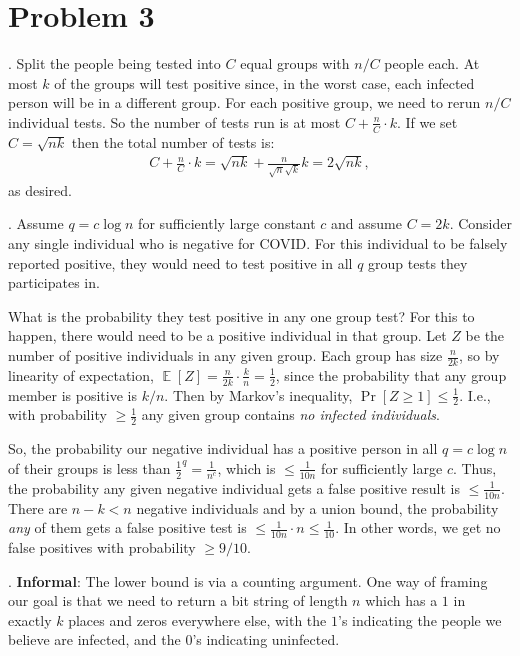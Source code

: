 \documentclass[11pt]{article}
\DeclareMathOperator*{\E}{\mathbb{E}}
\begin{document}
	
	\section*{Problem 3}
	\smallskip{}.\hspace{1em}
	Split the people being tested into $C$ equal groups with $n/C$ people each. At most $k$ of the groups will test positive since, in the worst case, each infected person will be in a different group. For each positive group, we need to rerun $n/C$ individual tests. So the number of tests run is at most $C + \frac{n}{C}\cdot k$. If we set $C = \sqrt{nk}$ then the total number of tests is:
	\begin{align*}
		C + \frac{n}{C}\cdot k = \sqrt{nk} + \frac{n}{\sqrt{n}\sqrt{k}}k = 2\sqrt{nk},
	\end{align*}  as desired. 

\smallskip{}.\hspace{1em}
Assume $q = c\log n$ for sufficiently large constant $c$ and assume $C = 2k$. Consider any single individual who is negative for COVID. For this individual to be falsely reported positive, they would need to test positive in all $q$ group tests they participates in. 

What is the probability they test positive in any one group test? For this to happen, there would need to be a positive individual in that group. Let $Z$ be the number of positive individuals in any given group. Each group has size $\frac{n}{2k}$, so by linearity of expectation, $\E[Z] = \frac{n}{2k}\cdot \frac{k}{n} = \frac{1}{2}$, since the probability that any group member is positive is $k/n$. Then by Markov's inequality, $\Pr[Z \geq 1] \leq \frac{1}{2}$. I.e., with probability $\geq \frac{1}{2}$ any given group contains \emph{no infected individuals}. 

So, the probability our negative individual has a positive person in all $q = c\log n$ of their groups is less than $\frac{1}{2}^{q} = \frac{1}{n^c}$, which is $\leq \frac{1}{10n}$ for sufficiently large $c$. Thus, the probability any given negative individual gets a false positive result is $\leq \frac{1}{10n}$. There are $n - k < n$ negative individuals and by a union bound, the probability \emph{any} of them gets a false positive test is $\leq \frac{1}{10n}\cdot n \leq \frac{1}{10}$. In other words, we get no false positives with probability $\geq 9/10$. 

\smallskip{}.\hspace{1em} \textbf{Informal}: The lower bound is via a counting argument. One way of framing our goal is that we need to return a bit string of length $n$ which has a $1$ in exactly $k$ places and zeros everywhere else, with the $1$'s indicating the people we believe are infected, and the $0$'s indicating uninfected. 
\end{document}
